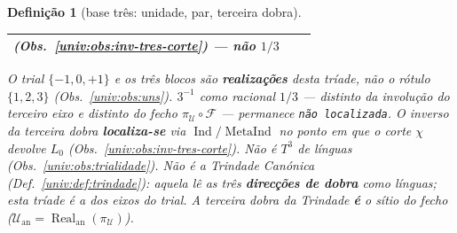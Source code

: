 \documentclass[11pt,a4paper]{article}
\newtheorem{definicao}[teorema]{Definição}
\begin{document}
\begin{definicao}[base três: unidade, par, terceira dobra]
\begin{center}
\begin{tabular}{@{}>{\raggedright\arraybackslash}p{}
                >{\raggedright\arraybackslash}p{}
                >{\raggedright\arraybackslash}p{}@{}}
    (Obs.~\ref{univ:obs:inv-tres-corte}) ---
    \textbf{não} \(1/3\) \\
\bottomrule
\end{tabular}
\end{center}
O trial \(\{-1,0,+1\}\) e os três blocos são
\textbf{realizações} desta tríade, não o rótulo
\(\{1,2,3\}\) (Obs.~\ref{univ:obs:uns}).
\(3^{-1}\) como racional \(1/3\) --- distinto da
involução do terceiro eixo e distinto do fecho
\(\pi_{\mathcal{U}}\circ\mathcal{F}\) --- permanece
\texttt{não localizada}.
O inverso da terceira dobra \textbf{localiza-se} via
\(\operatorname{Ind}/\operatorname{MetaInd}\) no ponto
em que o corte \(\chi\) devolve \(L_0\)
(Obs.~\ref{univ:obs:inv-tres-corte}).
Não é \(T^{3}\) de línguas
(Obs.~\ref{univ:obs:trialidade}).
Não é a Trindade Canónica
(Def.~\ref{univ:def:trindade}): aquela lê as três
\textbf{direcções de dobra} como línguas; esta tríade
é a dos eixos do trial. A terceira dobra da Trindade
\textbf{é} o sítio do fecho
(\(\mathcal{U}_{\mathrm{an}}=\operatorname{Real}_{\mathrm{an}}(\pi_{\mathcal{U}})\)).
\end{definicao}
\end{document}
